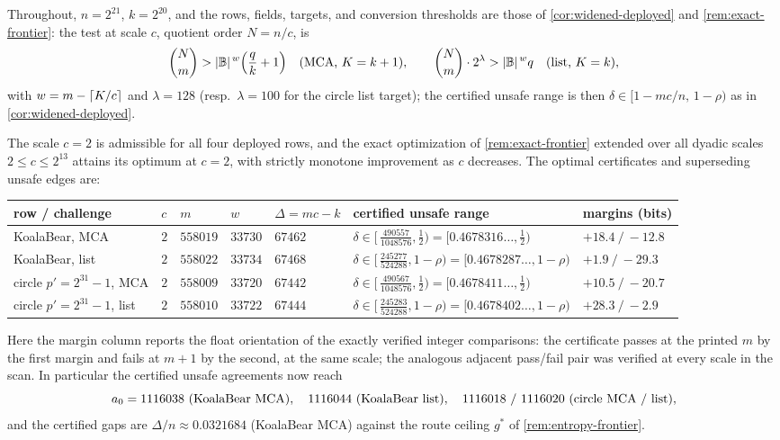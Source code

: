 Throughout, $n=2^{21}$, $k=2^{20}$, and the rows, fields, targets, and conversion thresholds are those of \cref{cor:widened-deployed} and \cref{rem:exact-frontier}: the test at scale $c$, quotient order $N=n/c$, is
\[
\binom Nm>|\mathbb B|^{\,w}\Bigl(\frac qk+1\Bigr)
\quad\text{\textup(MCA, $K=k+1$\textup)},
\qquad
\binom Nm\cdot 2^{\lambda}>|\mathbb B|^{\,w}q
\quad\text{\textup(list, $K=k$\textup)},
\]
with $w=m-\left\lceil K/c\right\rceil$ and $\lambda=128$ \textup(resp.\ $\lambda=100$ for the circle list target\textup); the certified unsafe range is then $\delta\in[1-mc/n,\,1-\rho)$ as in \cref{cor:widened-deployed}.

\begin{proposition}\label{prop:v13f-terminal}
The scale $c=2$ is admissible for all four deployed rows, and the exact optimization of \cref{rem:exact-frontier} extended over all dyadic scales $2\le c\le 2^{13}$ attains its optimum at $c=2$, with strictly monotone improvement as $c$ decreases.  The optimal certificates and superseding unsafe edges are:
\begin{center}\footnotesize
\begin{tabular}{@{}lllllll@{}}
\toprule
row / challenge & $c$ & $m$ & $w$ & $\Delta=mc-k$ & certified unsafe range & margins \textup(bits\textup)\\
\midrule
KoalaBear, MCA & $2$ & $558019$ & $33730$ & $67462$ & $\delta\in[\,\tfrac{490557}{1048576},\tfrac12)=[0.4678316\ldots,\tfrac12)$ & $+18.4\ /\ -12.8$\\
KoalaBear, list & $2$ & $558022$ & $33734$ & $67468$ & $\delta\in[\,\tfrac{245277}{524288},1-\rho)=[0.4678287\ldots,1-\rho)$ & $+1.9\ /\ -29.3$\\
circle $p'{=}2^{31}{-}1$, MCA & $2$ & $558009$ & $33720$ & $67442$ & $\delta\in[\,\tfrac{490567}{1048576},\tfrac12)=[0.4678411\ldots,\tfrac12)$ & $+10.5\ /\ -20.7$\\
circle $p'{=}2^{31}{-}1$, list & $2$ & $558010$ & $33722$ & $67444$ & $\delta\in[\,\tfrac{245283}{524288},1-\rho)=[0.4678402\ldots,1-\rho)$ & $+28.3\ /\ -2.9$\\
\bottomrule
\end{tabular}
\end{center}
Here the margin column reports the float orientation of the exactly verified integer comparisons: the certificate passes at the printed $m$ by the first margin and fails at $m+1$ by the second, at the same scale; the analogous adjacent pass/fail pair was verified at every scale in the scan.  In particular the certified unsafe agreements now reach
\[
a_0=1116038\ \textup(\text{KoalaBear MCA}\textup),\quad
1116044\ \textup(\text{KoalaBear list}\textup),\quad
1116018\ /\ 1116020\ \textup(\text{circle MCA / list}\textup),
\]
and the certified gaps are $\Delta/n\approx0.0321684$ \textup(KoalaBear MCA\textup) against the route ceiling $g^*$ of \cref{rem:entropy-frontier}.
\end{proposition}

